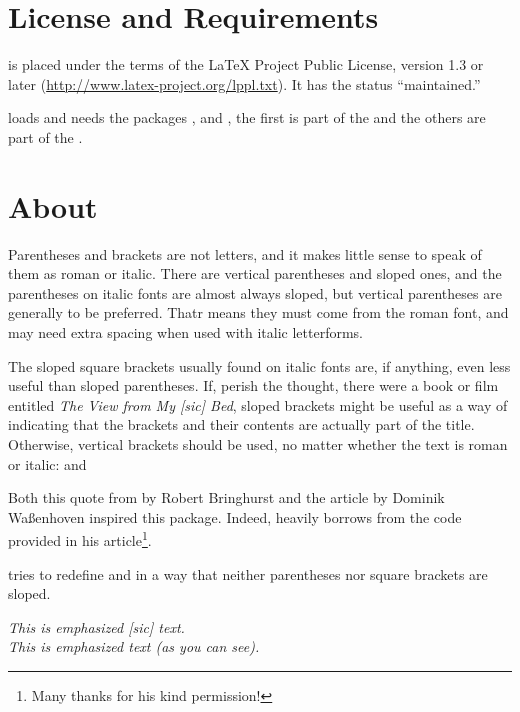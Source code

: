 \documentclass[DIV10,toc=index,toc=bib]{cnpkgdoc}
\begin{document}
\section{License and Requirements}
\embrac is placed under the terms of the LaTeX Project Public License,
version 1.3 or later (\url{http://www.latex-project.org/lppl.txt}).
It has the status ``maintained.''

\embrac loads and needs the packages ,  and
, the first is part of the  and the others are
part of the .

\section{About}\label{sec:about}
\begin{zitat}
 Parentheses and brackets are not letters, and it makes little sense to speak of
 them as roman or italic. There are vertical parentheses and sloped ones, and
 the parentheses on italic fonts are almost always sloped, but vertical parentheses
 are generally to be preferred. Thatr means they must come from the roman font,
 and may need extra spacing when used with italic letterforms.
 
 The sloped square brackets usually found on italic fonts are, if anything, even
 less useful than sloped parentheses. If, perish the thought, there were a book
 or film entitled \emph*{The View from My [sic] Bed}, sloped brackets might be
 useful as a way of indicating that the brackets and their contents are actually
 part of the title. Otherwise, vertical brackets should be used, no matter whether
 the text is roman or italic:  and
\end{zitat}

Both this quote from  by Robert Bringhurst and the
article  by Dominik Waßenhoven \cite{dtk12-dw} inspired
this package. Indeed, \embrac heavily borrows from the code \citeauthor{dtk12-dw}
provided in his article\footnote{Many thanks for his kind permission!}.

\embrac tries to redefine  and  in a way that neither
parentheses nor square brackets are sloped. 

\begin{beispiel}
 \emph{This is emphasized [sic] text.} \\
 \emph{This is emphasized text (as you can see).}
\end{beispiel}
\end{document}
